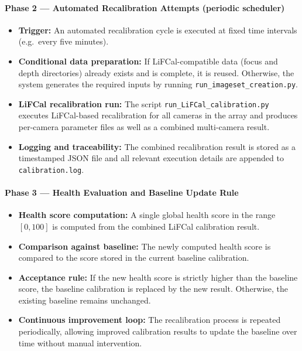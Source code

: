 \documentclass[12pt]{scrartcl}
\begin{document}
\vspace{0.2cm}

\paragraph{Phase 2 — Automated Recalibration Attempts (periodic scheduler)}
\begin{itemize}
  \item \textbf{Trigger:}
  An automated recalibration cycle is executed at fixed time intervals
  (e.g.\ every five minutes).

  \item \textbf{Conditional data preparation:}
  If LiFCal-compatible data (focus and depth directories) already exists and is
  complete, it is reused. Otherwise, the system generates the required inputs by
  running \texttt{run\_imageset\_creation.py}.

  \item \textbf{LiFCal recalibration run:}
  The script \texttt{run\_LiFCal\_calibration.py} executes LiFCal-based
  recalibration for all cameras in the array and produces per-camera parameter
  files as well as a combined multi-camera result.

  \item \textbf{Logging and traceability:}
  The combined recalibration result is stored as a timestamped JSON file and all
  relevant execution details are appended to \texttt{calibration.log}.
\end{itemize}

\vspace{0.2cm}

\paragraph{Phase 3 — Health Evaluation and Baseline Update Rule}
\begin{itemize}
  \item \textbf{Health score computation:}
  A single global health score in the range $[0,100]$ is computed from the combined
  LiFCal calibration result.

  \item \textbf{Comparison against baseline:}
  The newly computed health score is compared to the score stored in the current
  baseline calibration.

  \item \textbf{Acceptance rule:}
  If the new health score is strictly higher than the baseline score, the baseline
  calibration is replaced by the new result. Otherwise, the existing baseline
  remains unchanged.

  \item \textbf{Continuous improvement loop:}
  The recalibration process is repeated periodically, allowing improved calibration
  results to update the baseline over time without manual intervention.
\end{itemize}
\end{document}

